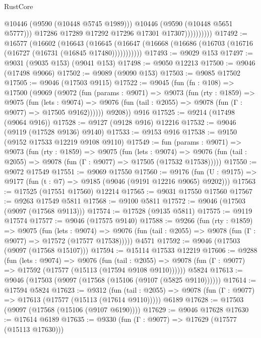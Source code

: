 \begin{lexlean}{RustCore}
\begin{coremodule}
                            @10446
                            (@9590 (@10448 @5745 @1989)))
                          @10446
                          (@9590 (@10448 @5651 @5777)))
                        @17286
                        @17289
                        @17292
                        @17296
                        @17301
                        @17307))))))))))
@17492 := @16577
    (@16602
      (@16643
        (@16645 (@16647 (@16668 (@16686 (@16703 (@16716 (@16727 (@16731 (@16845 @17480)))))))))))
@17493 := @9029 @153
@17497 := @9031 (@9035 @153) (@9041 @153)
@17498 := @9050 @12213
@17500 := @9046 (@17498 @9066)
@17502 := @9089 (@9090 @153)
@17503 := @9085 @17502
@17505 := @9046 (@17503 @9115)
@17522 := @9045
    (fun (fn : @108) =>
    @17500
      (@9069
        (@9072
          (fun (params : @9071) =>
          @9073
            (fun (rty : @1859) =>
            @9075
              (fun (lets : @9074) =>
              @9076 (fun (tail : @2055) => @9078 (fun (Γ : @9077) => @17505 @9162))))))
        @9208))
    @916
@17525 := @9214 (@17498 (@9064 @916))
@17528 := @9127 (@9128 @916) @12216
@17532 := @9046 (@9119 (@17528 @9136) @9140)
@17533 := @9153 @916
@17538 := @9150 (@9152 @17533 @12219 @9108 @9110)
@17549 := fun (params : @9071) =>
  @9073
    (fun (rty : @1859) =>
    @9075
      (fun (lets : @9074) =>
      @9076 (fun (tail : @2055) => @9078 (fun (Γ : @9077) => @17505 (@17532 @17538)))))
@17550 := @9072 @17549
@17551 := @9069 @17550
@17560 := @9176
    (fun (U : @9175) => @9177 (fun (t : @7) => @9185 (@9046 (@9191 @12216 @9065) @9202)))
@17563 := @17525 (@17551 @17560) @12214
@17565 := @9031 @17550 @17560
@17567 := @9263 @17549 @5811
@17568 := @9100 @5811
@17572 := @9046 (@17503 (@9097 (@17568 @9113)))
@17574 := @17528 (@9135 @5811)
@17575 := @9119 @17574
@17577 := @9046 (@17575 @9140)
@17588 := @9266
    (fun (rty : @1859) =>
    @9075
      (fun (lets : @9074) =>
      @9076 (fun (tail : @2055) => @9078 (fun (Γ : @9077) => @17572 (@17577 @17538)))))
    @4571
@17592 := @9046 (@17503 (@9097 (@17568 @15107)))
@17594 := @15114 @17533 @12219
@17606 := @9288
    (fun (lets : @9074) =>
    @9076
      (fun (tail : @2055) =>
      @9078 (fun (Γ : @9077) => @17592 (@17577 (@15113 (@17594 @9108 @9110))))))
    @5824
@17613 := @9046 (@17503 (@9097 (@17568 (@15106 (@9107 (@5825 @9110))))))
@17614 := @17594 @5824
@17623 := @9312
    (fun (tail : @2055) => @9078 (fun (Γ : @9077) => @17613 (@17577 (@15113 (@17614 @9110)))))
    @6189
@17628 := @17503 (@9097 (@17568 (@15106 (@9107 @6190))))
@17629 := @9046 @17628
@17630 := @17614 @6189
@17635 := @9330 (fun (Γ : @9077) => @17629 (@17577 (@15113 @17630)))

\end{coremodule}
\end{lexlean}
